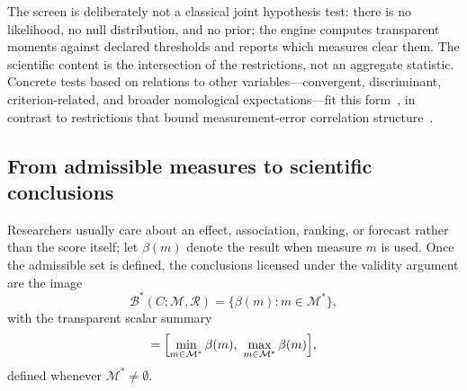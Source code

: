 \documentclass[10pt,letterpaper]{article}
\newcommand{\M}{\ensuremath{\mathcal{M}}}
\newcommand{\Rset}{\mathcal{R}}
\newcommand{\Bset}{\mathcal{B}}
\begin{document}
The screen is deliberately not a classical joint hypothesis test: there is no likelihood, no null distribution, and no prior; the engine computes transparent moments against declared thresholds and reports which measures clear them.
The scientific content is the intersection of the restrictions, not an aggregate statistic.
Concrete tests based on relations to other variables---convergent, discriminant, criterion-related, and broader nomological expectations---fit this form~\cite{proxy2026,halterman2026}, in contrast to restrictions that bound measurement-error correlation structure~\cite{chenrttamer2026}.

\subsection{From admissible measures to scientific conclusions}
\label{sec:propagate}

Researchers usually care about an effect, association, ranking, or forecast rather than the score itself; let $\beta(m)$ denote the result when measure $m$ is used.
Once the admissible set is defined, the conclusions licensed under the validity argument are the image
\begin{equation}
\Bset^*(C;\M,\Rset)=\bigl\{\beta(m):m\in\M^*\bigr\},
\label{eq:Theta}
\end{equation}
with the transparent scalar summary
\begin{equation}
[L,U]=\Bigl[\min_{m\in\M^*}\beta(m),\ \max_{m\in\M^*}\beta(m)\Bigr],
\label{eq:range}
\end{equation}
defined whenever $\M^*\neq\emptyset$.
\end{document}
